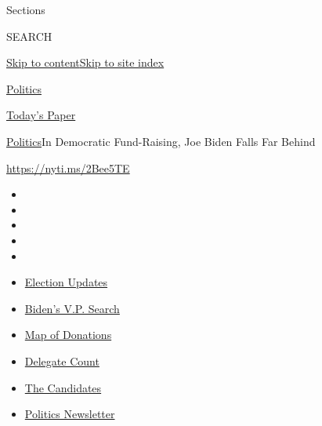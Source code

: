 Sections

SEARCH

\protect\hyperlink{site-content}{Skip to
content}\protect\hyperlink{site-index}{Skip to site index}

\href{https://www.nytimes.com/section/politics}{Politics}

\href{https://myaccount.nytimes.com/auth/login?response_type=cookie\&client_id=vi}{}

\href{https://www.nytimes.com/section/todayspaper}{Today's Paper}

\href{/section/politics}{Politics}\textbar{}In Democratic Fund-Raising,
Joe Biden Falls Far Behind

\url{https://nyti.ms/2Bee5TE}

\begin{itemize}
\item
\item
\item
\item
\item
\end{itemize}

\begin{itemize}
\item
  \href{https://www.nytimes.com/2020/07/31/us/elections/biden-vs-trump.html?action=click\&pgtype=Article\&state=default\&region=TOP_BANNER\&context=storylines_menu}{Election
  Updates}
\item
  \href{https://www.nytimes.com/article/biden-vice-president-2020.html?action=click\&pgtype=Article\&state=default\&region=TOP_BANNER\&context=storylines_menu}{Biden's
  V.P. Search}
\item
  \href{https://www.nytimes.com/interactive/2020/07/24/us/politics/trump-biden-campaign-donors.html?action=click\&pgtype=Article\&state=default\&region=TOP_BANNER\&context=storylines_menu}{Map
  of Donations}
\item
  \href{https://www.nytimes.com/interactive/2020/us/elections/delegate-count-primary-results.html?action=click\&pgtype=Article\&state=default\&region=TOP_BANNER\&context=storylines_menu}{Delegate
  Count}
\item
  \href{https://www.nytimes.com/interactive/2019/us/politics/2020-presidential-candidates.html?action=click\&pgtype=Article\&state=default\&region=TOP_BANNER\&context=storylines_menu}{The
  Candidates}
\item
  \href{https://www.nytimes.com/newsletters/politics?action=click\&pgtype=Article\&state=default\&region=TOP_BANNER\&context=storylines_menu}{Politics
  Newsletter}
\end{itemize}


